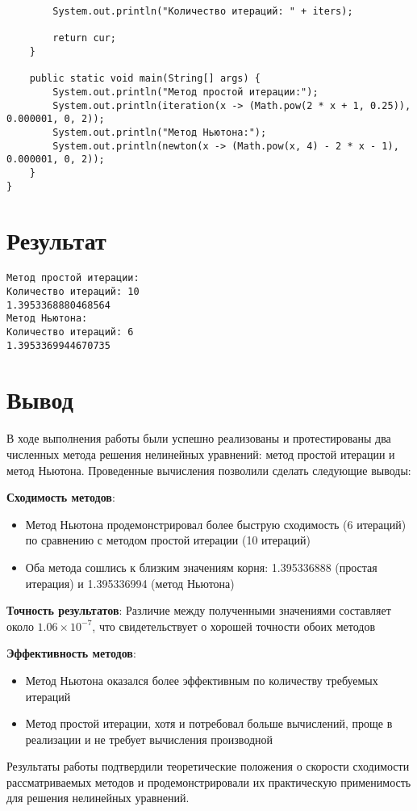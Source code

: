 \begin{verbatim}
        System.out.println("Количество итераций: " + iters);

        return cur;
    }

    public static void main(String[] args) {
        System.out.println("Метод простой итерации:");
        System.out.println(iteration(x -> (Math.pow(2 * x + 1, 0.25)), 0.000001, 0, 2));
        System.out.println("Метод Ньютона:");
        System.out.println(newton(x -> (Math.pow(x, 4) - 2 * x - 1), 0.000001, 0, 2));
    }
}
\end{verbatim}

\section*{Результат}

\begin{verbatim}
Метод простой итерации:
Количество итераций: 10
1.3953368880468564
Метод Ньютона:
Количество итераций: 6
1.3953369944670735
\end{verbatim}

\section*{Вывод}

В ходе выполнения работы были успешно реализованы и протестированы два численных метода решения нелинейных уравнений: 
метод простой итерации и метод Ньютона. Проведенные вычисления позволили сделать следующие выводы:

\textbf{Сходимость методов}:
\begin{itemize}
\item Метод Ньютона продемонстрировал более быструю сходимость (6 итераций) по сравнению с методом простой итерации (10 итераций)
\item Оба метода сошлись к близким значениям корня: 1.395336888 (простая итерация) и 1.395336994 (метод Ньютона)
\end{itemize}

\textbf{Точность результатов}:
Различие между полученными значениями составляет около $1.06 \times 10^{-7}$, что свидетельствует о хорошей точности обоих методов

\textbf{Эффективность методов}:
\begin{itemize}
\item Метод Ньютона оказался более эффективным по количеству требуемых итераций
\item Метод простой итерации, хотя и потребовал больше вычислений, проще в реализации и не требует вычисления производной
\end{itemize}

Результаты работы подтвердили теоретические положения о скорости сходимости рассматриваемых методов и продемонстрировали 
их практическую применимость для решения нелинейных уравнений.

\pagebreak
